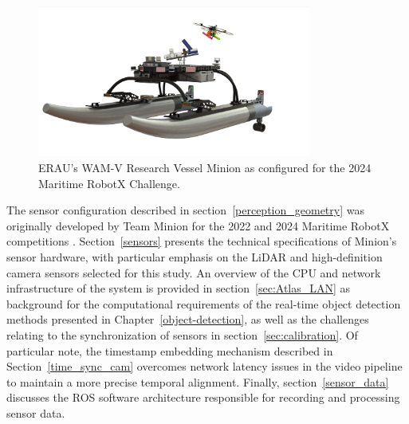 \documentclass{erauthesis}
\begin{document}

\begin{figure}[t]
\centering
\includegraphics[width=0.8\textwidth]{Images/Minion.png}
\caption{ERAU's \ac{WAM-V} Research Vessel Minion as configured for the 2024 Maritime RobotX Challenge.}
\label{fig:minion}
\end{figure}

The sensor configuration described in section~\ref{perception_geometry} was originally developed by Team Minion for the 2022 and 2024 Maritime RobotX competitions \cite{holland2024, thompson2023}. Section~\ref{sensors} presents the technical specifications of Minion's sensor hardware, with particular emphasis on the \ac{LiDAR} and high-definition camera sensors selected for this study.
An overview of the CPU and network infrastructure of the system is provided in section~\ref{sec:Atlas_LAN} as background for the computational requirements of the real-time object detection methods presented in Chapter~\ref{object-detection}, as well as the challenges relating to the synchronization of sensors in section~\ref{sec:calibration}.
Of particular note, the timestamp embedding mechanism described in Section~\ref{time_sync_cam} overcomes network latency issues in the video pipeline to maintain a more precise temporal alignment.
Finally, section~\ref{sensor_data} discusses the \ac{ROS} software architecture responsible for recording and processing sensor data.
\end{document}
